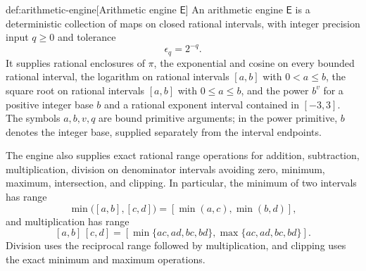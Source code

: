\documentclass[11pt]{article}
\begin{document}
\begin{definitionv}{def:arithmetic-engine}[Arithmetic engine $\mathsf E$]
An arithmetic engine \(\mathsf E\) is a deterministic collection of maps on closed rational intervals, with integer precision input \(q\ge 0\) and tolerance
\[
\epsilon_q=2^{-q}.
\]
It supplies rational enclosures of \(\pi\), the exponential and cosine on every bounded rational interval, the logarithm on rational intervals \([a,b]\) with \(0<a\le b\), the square root on rational intervals \([a,b]\) with \(0\le a\le b\), and the power \(b^v\) for a positive integer base \(b\) and a rational exponent interval contained in \([-3,3]\). The symbols \(a,b,v,q\) are bound primitive arguments; in the power primitive, \(b\) denotes the integer base, supplied separately from the interval endpoints.

The engine also supplies exact rational range operations for addition, subtraction, multiplication, division on denominator intervals avoiding zero, minimum, maximum, intersection, and clipping. In particular, the minimum of two intervals has range
\[
\min\bigl([a,b],[c,d]\bigr)
=
[\min(a,c),\min(b,d)],
\]
and multiplication has range
\[
[a,b]\,[c,d]
=
[\min\{ac,ad,bc,bd\},\max\{ac,ad,bc,bd\}].
\]
Division uses the reciprocal range followed by multiplication, and clipping uses the exact minimum and maximum operations.


\end{definitionv}
\end{document}
